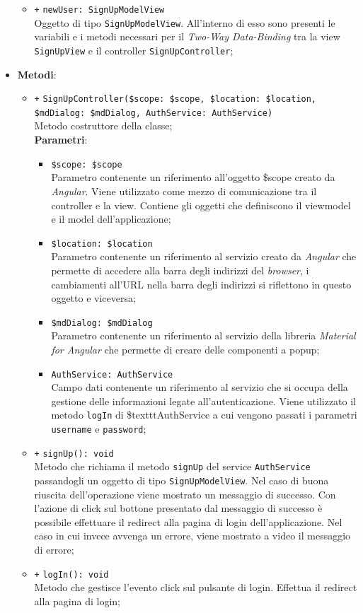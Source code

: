 \begin{itemize}
\begin{itemize}
		\item \texttt{+} \texttt{newUser: SignUpModelView} \\
		Oggetto di tipo \texttt{SignUpModelView}. All'interno di esso sono presenti le variabili e i metodi necessari per il \textit{Two-Way Data-Binding} tra la view \texttt{SignUpView} e il controller \texttt{SignUpController};
	\end{itemize}
	\item \textbf{Metodi}:
	\begin{itemize}
		\item \texttt{+} \texttt{SignUpController(\$scope: \$scope, \$location: \$location, \$mdDialog: \$mdDialog, AuthService: AuthService)} \\
		Metodo costruttore della classe; \\
		\textbf{Parametri}:
		\begin{itemize}
			\item \texttt{\$scope: \$scope} \\
			Parametro contenente un riferimento all’oggetto \$scope creato da \textit{Angular}. Viene utilizzato come mezzo di comunicazione tra il controller e la view. Contiene gli oggetti che definiscono il viewmodel e il model dell’applicazione;
			\item \texttt{\$location: \$location} \\
			Parametro contenente un riferimento al servizio creato da \textit{Angular} che permette di accedere alla barra degli indirizzi del \textit{browser}, i cambiamenti all’URL nella barra degli indirizzi si riflettono in questo oggetto e viceversa;
			\item \texttt{\$mdDialog: \$mdDialog} \\
			Parametro contenente un riferimento al servizio della libreria \textit{Material for Angular} che permette di creare delle componenti a popup;
			\item \texttt{AuthService: AuthService} \\
			Campo dati contenente un riferimento al servizio che si occupa della gestione delle informazioni legate all’autenticazione. Viene utilizzato il metodo \texttt{logIn} di \$texttt{AuthService} a cui vengono passati i parametri \texttt{username} e \texttt{password};
		\end{itemize}
		\item \texttt{+} \texttt{signUp(): void} \\
		Metodo che richiama il metodo \texttt{signUp} del service \texttt{AuthService} passandogli un oggetto di tipo \texttt{SignUpModelView}. Nel caso di buona riuscita dell'operazione viene mostrato un messaggio di successo. Con l'azione di click sul bottone presentato dal messaggio di successo è possibile effettuare il redirect alla pagina di login dell'applicazione. Nel caso in cui invece avvenga un errore, viene mostrato a video il messaggio di errore;
		\item \texttt{+} \texttt{logIn(): void} \\
		Metodo che gestisce l’evento click sul pulsante di login. Effettua il redirect alla pagina di login;
	

\end{itemize}
\end{itemize}
